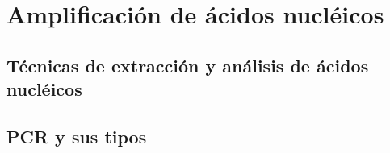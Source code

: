 \documentclass{../summarie}
\begin{document}
\part{Amplificación de ácidos nucléicos}

    \chapter{Técnicas de extracción y análisis de ácidos nucléicos} 
    \chapter{PCR y sus tipos} 


\backmatter



\appendix

    
\end{document}
